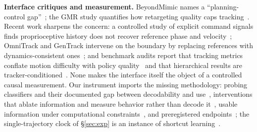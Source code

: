 \documentclass[conference]{IEEEtran}
\begin{document}
\textbf{Interface critiques and measurement.} BeyondMimic names a ``planning-control
gap''~\cite{beyondmimic}; the GMR study quantifies how retargeting quality caps
tracking~\cite{gmr}. Recent work sharpens the concern: a controlled study of explicit
command signals finds proprioceptive history does not recover reference phase and
velocity~\cite{whatmatters}; OmniTrack and GenTrack intervene on the boundary by
replacing references with dynamics-consistent ones~\cite{omnitrack,gentrack}; and
benchmark audits report that tracking metrics conflate motion difficulty with policy
quality~\cite{mds} and that hierarchical results are
tracker-conditioned~\cite{humanoidarena}. None makes the interface itself the object of
a controlled causal measurement. Our instrument imports the missing methodology:
probing classifiers and their documented gap between decodability and
use~\cite{linearprobes,probingsurvey}, interventions that ablate information and
measure behavior rather than decode it~\cite{amnesic}, usable information under
computational constraints~\cite{vinfo}, and preregistered
endpoints~\cite{prereg,preregml}; the single-trajectory clock of \S\ref{sec:exp} is an
instance of shortcut learning~\cite{shortcut}.
\end{document}
